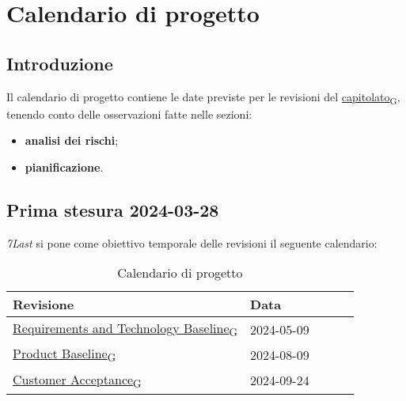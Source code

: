 \section{Calendario di progetto}
\subsection{Introduzione}
Il calendario di progetto contiene le date previste per le revisioni del \href{https://7last.github.io/docs/rtb/documentazione-interna/glossario\#capitolato}{capitolato\textsubscript{G}}, tenendo conto delle osservazioni fatte nelle sezioni:
\begin{itemize}
    \item \textbf{analisi dei rischi};
    \item \textbf{pianificazione}.
\end{itemize}

\subsection{Prima stesura 2024-03-28}
\textit{7Last} si pone come obiettivo temporale delle revisioni il seguente calendario:
\begin{table}[!h]
    \begin{center}
        \begin{tabular}{ | l | l | l | l | l | }
            \hline
            Revisione                               & Data       \\ \hline
            \href{https://7last.github.io/docs/rtb/documentazione-interna/glossario\#requirements-and-technology-baseline}{Requirements and Technology Baseline\textsubscript{G}}    & 2024-05-09 \\
            \href{https://7last.github.io/docs/rtb/documentazione-interna/glossario\#product-baseline}{Product Baseline\textsubscript{G}}                        & 2024-08-09 \\
            \href{https://7last.github.io/docs/rtb/documentazione-interna/glossario\#customer-acceptance}{Customer Acceptance\textsubscript{G}}                     & 2024-09-24 \\
            \hline
        \end{tabular}
    \end{center}
    \caption{Calendario di progetto}
\end{table}

